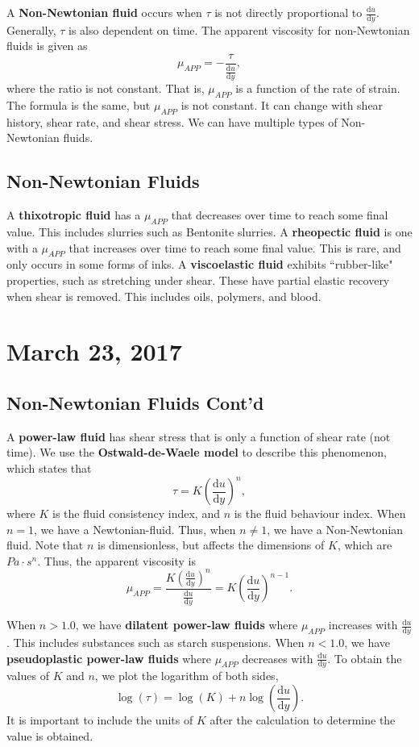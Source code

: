 \documentclass[11pt]{article}
\theoremstyle{plain} %
\theoremstyle{definition}
\theoremstyle{example}
\theoremstyle{remark}
\begin{document}
A \textbf{Non-Newtonian fluid} occurs when $\tau$ is not directly proportional to $\frac{\mathrm d u}{\mathrm d y}$. Generally, $\tau$ is also dependent on time. The apparent viscosity for non-Newtonian fluids is given as 
$$\mu_{APP} = -\frac{\tau}{\frac{\mathrm d u}{\mathrm d y}},$$
where the ratio is not constant. That is, $\mu_{APP}$ is a function of the rate of strain. The formula is the same, but $\mu_{APP}$ is not constant. It can change with shear history, shear rate, and shear stress. We can have multiple types of Non-Newtonian fluids. 

\subsection{Non-Newtonian Fluids}
A \textbf{thixotropic fluid} has a $\mu_{APP}$ that decreases over time to reach some final value. This includes slurries such as Bentonite slurries. A \textbf{rheopectic fluid} is one with a $\mu_{APP}$ that increases over time to reach some final value. This is rare, and only occurs in some forms of inks. A \textbf{viscoelastic fluid} exhibits ``rubber-like" properties, such as stretching under shear. These have partial elastic recovery when shear is removed. This includes oils, polymers, and blood. \section{March 23, 2017}
\subsection{Non-Newtonian Fluids Cont'd}
	
	A \textbf{power-law fluid} has shear stress that is only a function of shear rate (not time). We use the \textbf{Ostwald-de-Waele model} to describe this phenomenon, which states that 
	$$\tau = K\left(\frac{\mathrm d u}{\mathrm d y}\right)^n,$$
	where $K$ is the fluid consistency index, and $n$ is the fluid behaviour index. When $n=1$, we have a Newtonian-fluid. Thus, when $n\neq 1$, we have a Non-Newtonian fluid. Note that $n$ is dimensionless, but affects the dimensions of $K$, which are $Pa\cdot s^n$. Thus, the apparent viscosity is 
$$\mu_{APP} = \frac{K \left(\frac{\mathrm d u}{\mathrm d y}\right)^n}{\frac{\mathrm d u}{\mathrm d y}} = K\left(\frac{\mathrm d u}{\mathrm d y}\right)^{n-1}.$$ 

When $n>1.0$, we have \textbf{dilatent power-law fluids} where $\mu_{APP}$ increases with $\frac{\mathrm d u}{\mathrm d y}$. This includes substances such as starch suspensions. 
When $n<1.0$, we have \textbf{pseudoplastic power-law fluids} where $\mu_{APP}$ decreases with $\frac{\mathrm d u}{\mathrm d y}$. To obtain the values of $K$ and $n$, we plot the logarithm of both sides,
$$\log(\tau) = \log(K) + n\log\left(\frac{\mathrm d u}{\mathrm d y}\right).$$
It is important to include the units of $K$ after the calculation to determine the value is obtained. 
\end{document}
